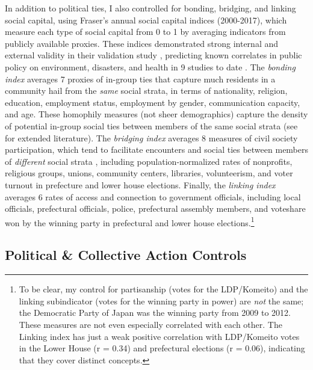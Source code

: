\documentclass[preprint, 3p,
authoryear]{elsarticle} %
\begin{document}
In addition to political ties, I also controlled for bonding, bridging,
and linking social capital, using Fraser's annual social capital indices
(2000-2017), which measure each type of social capital from 0 to 1 by
averaging indicators from publicly available proxies. These indices
demonstrated strong internal and external validity in their validation
study \citep{fraser_2021_IJDRR}, predicting known correlates in public
policy on environment, disasters, and health in 9 studies to date
\citep[eg.][]{fraser_et_al_2020, fraser_and_aldrich_2021_SR, fraser_et_al_2021_CRM, fraser_et_al_2022_EIST}.
The \emph{bonding index} averages 7 proxies of in-group ties that
capture much residents in a community hail from the \emph{same} social
strata, in terms of nationality, religion, education, employment status,
employment by gender, communication capacity, and age. These homophily
measures (not sheer demographics) capture the density of potential
in-group social ties between members of the same social strata (see
\citet{fraser_2021_IJDRR} for extended literature). The \emph{bridging
index} averages 8 measures of civil society participation, which tend to
facilitate encounters and social ties between members of
\emph{different} social strata \citep{putnam_2000}, including
population-normalized rates of nonprofits, religious groups, unions,
community centers, libraries, volunteerism, and voter turnout in
prefecture and lower house elections. Finally, the \emph{linking index}
averages 6 rates of access and connection to government officials,
including local officials, prefectural officials, police, prefectural
assembly members, and voteshare won by the winning party in prefectural
and lower house elections.\footnote{To be clear, my control for
  partisanship (votes for the LDP/Komeito) and the linking subindicator
  (votes for the winning party in power) are \emph{not} the same; the
  Democratic Party of Japan was the winning party from 2009 to 2012.
  These measures are not even especially correlated with each other. The
  Linking index has just a weak positive correlation with LDP/Komeito
  votes in the Lower House (r = 0.34) and prefectural elections (r =
  0.06), indicating that they cover distinct concepts.}

\hypertarget{political-collective-action-controls}{%
\subsection{Political \& Collective Action
Controls}\label{political-collective-action-controls}}
\end{document}
